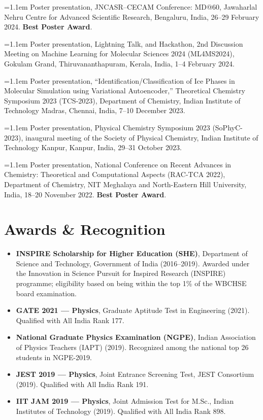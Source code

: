 \documentclass[10pt,a4paper]{article}
\newcommand{\confentry}[1]{%
  \par\noindent\hangindent=1.1em\hangafter=1 #1\par\vspace{5pt}%
}
\begin{document}
\confentry{Poster presentation, JNCASR--CECAM Conference: MD@60, Jawaharlal Nehru Centre for
  Advanced Scientific Research, Bengaluru, India, 26--29 February 2024. \textbf{Best Poster
    Award}.}

\confentry{Poster presentation, Lightning Talk, and Hackathon, 2nd Discussion Meeting on
  Machine Learning for Molecular Sciences 2024 (ML4MS2024), Gokulam Grand,
  Thiruvananthapuram, Kerala, India, 1--4 February 2024.}

\confentry{Poster presentation, ``Identification/Classification of Ice Phases in Molecular
  Simulation using Variational Autoencoder,'' Theoretical Chemistry Symposium 2023 (TCS-2023),
  Department of Chemistry, Indian Institute of Technology Madras, Chennai, India,
  7--10 December 2023.}

\confentry{Poster presentation, Physical Chemistry Symposium 2023 (SoPhyC-2023), inaugural
  meeting of the Society of Physical Chemistry, Indian Institute of Technology Kanpur, Kanpur,
  India, 29--31 October 2023.}

\confentry{Poster presentation, National Conference on Recent Advances in Chemistry:
  Theoretical and Computational Aspects (RAC-TCA 2022), Department of Chemistry, NIT Meghalaya
  and North-Eastern Hill University, India, 18--20 November 2022. \textbf{Best Poster Award}.}

\section{Awards \& Recognition}

\begin{itemize}
  \item \textbf{INSPIRE Scholarship for Higher Education (SHE)}, Department of Science and
        Technology, Government of India (2016--2019). Awarded under the Innovation in Science Pursuit
        for Inspired Research (INSPIRE) programme; eligibility based on being within the top 1\% of the
        WBCHSE board examination.
  \item \textbf{GATE 2021 --- Physics}, Graduate Aptitude Test in Engineering (2021). Qualified
        with All India Rank 177.
  \item \textbf{National Graduate Physics Examination (NGPE)}, Indian Association of Physics
        Teachers (IAPT) (2019). Recognized among the national top 26 students in NGPE-2019.
  \item \textbf{JEST 2019 --- Physics}, Joint Entrance Screening Test, JEST Consortium (2019).
        Qualified with All India Rank 191.
  \item \textbf{IIT JAM 2019 --- Physics}, Joint Admission Test for M.Sc., Indian Institutes of
        Technology (2019). Qualified with All India Rank 898.
\end{itemize}
\end{document}
